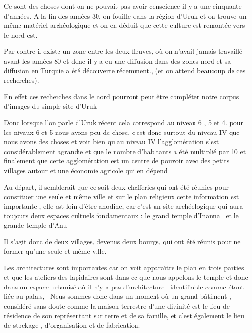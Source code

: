 \documentclass[a4paper]{article}
\begin{document}
\bigskip

{
Ce sont des choses dont on ne pouvait pas avoir conscience il y a une
cinquante d'années. A la fin des années 30, on fouille dans la région
d'Uruk et on trouve un même matériel archéologique et on en déduit que
cette culture est remontée vers le nord est. }

{
Par contre il existe un zone entre les deux fleuves, où on n'avait
jamais travaillé avant les années 80 et donc il y a eu une diffusion
dans des zones nord et sa diffusion en Turquie a été découverte
récemment., (et on attend beaucoup de ces recherches).}

{
En effet ces recherches dans le nord pourront peut être compléter notre
corpus d'images du simple site d'Uruk}


\bigskip

{
Donc lorsque l'on parle d'Uruk récent cela correspond au niveau 6 , 5 et
4. pour les nivaux 6 et 5 nous avons peu de chose, c'est donc surtout
du niveau IV que nous avons des choses et voit bien qu'au niveau IV
l'agglomération s'est considérablement agrandie et que le nombre
d'habitants a été multiplié par 10 et finalement que cette
agglomération est un centre de pouvoir avec des petits villages autour
et une économie agricole qui en dépend}

{
Au départ, il semblerait que ce soit deux chefferies qui ont été réunies
pour constituer une seule et même ville et sur le plan religieux cette
information est importante , elle est loin d'être anodine, car c'est un
site archéologique qui aura toujours deux espaces cultuels fondamentaux
: le grand temple d'Inanna \ et le grande temple d'Anu}

{
Il s'agit donc de deux villages, devenus deux bourgs, qui ont été réunis
pour ne former qu'une seule et même ville.}


\bigskip

{
Les architectures sont importantes car on voit apparaître le plan en
trois parties et que les ateliers des lapidaires sont dans ce que nous
appelons le temple et donc dans un espace urbanisé où il n'y a pas
d'architecture \ identifiable comme étant liée au palais, \ Nous sommes
donc dans un moment où un grand bâtiment , considéré sans doute comme
la maison terrestre d'une divinité est le lieu de résidence de son
représentant sur terre et de sa famille, et c'est également le lieu de
stockage , d'organisation et de fabrication.}
\end{document}
